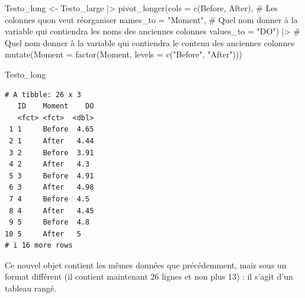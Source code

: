 \documentclass[
  french,
  a4paper,
  DIV=11,
  numbers=noendperiod,
  oneside]{scrreprt}
\newenvironment{Shaded}{}{}
\newcommand{\AttributeTok}[1]{\textcolor[rgb]{0.84,0.23,0.29}{#1}}
\newcommand{\CommentTok}[1]{\textcolor[rgb]{0.42,0.45,0.49}{#1}}
\newcommand{\FunctionTok}[1]{\textcolor[rgb]{0.44,0.26,0.76}{#1}}
\newcommand{\NormalTok}[1]{\textcolor[rgb]{0.14,0.16,0.18}{#1}}
\newcommand{\OtherTok}[1]{\textcolor[rgb]{0.44,0.26,0.76}{#1}}
\newcommand{\SpecialCharTok}[1]{\textcolor[rgb]{0.00,0.36,0.77}{#1}}
\newcommand{\StringTok}[1]{\textcolor[rgb]{0.01,0.18,0.38}{#1}}
\begin{document}
\begin{Shaded}
\begin{Highlighting}[]
\NormalTok{Testo\_long }\OtherTok{\textless{}{-}}\NormalTok{ Testo\_large }\SpecialCharTok{|\textgreater{}}
  \FunctionTok{pivot\_longer}\NormalTok{(}\AttributeTok{cols =} \FunctionTok{c}\NormalTok{(Before, After),   }\CommentTok{\# Les colonnes qu\textquotesingle{}on veut réorganiser}
               \AttributeTok{names\_to =} \StringTok{"Moment"}\NormalTok{,   }\CommentTok{\# Quel nom donner à la variable qui contiendra les noms des anciennes colonnes}
               \AttributeTok{values\_to =} \StringTok{"DO"}\NormalTok{) }\SpecialCharTok{|\textgreater{}}      \CommentTok{\# Quel nom donner à la variable qui contiendra le contenu des anciennes colonnes}
  \FunctionTok{mutate}\NormalTok{(}\AttributeTok{Moment =} \FunctionTok{factor}\NormalTok{(Moment, }\AttributeTok{levels =} \FunctionTok{c}\NormalTok{(}\StringTok{"Before"}\NormalTok{, }\StringTok{"After"}\NormalTok{)))}

\NormalTok{Testo\_long}
\end{Highlighting}
\end{Shaded}

\begin{verbatim}
# A tibble: 26 x 3
   ID    Moment    DO
   <fct> <fct>  <dbl>
 1 1     Before  4.65
 2 1     After   4.44
 3 2     Before  3.91
 4 2     After   4.3 
 5 3     Before  4.91
 6 3     After   4.98
 7 4     Before  4.5 
 8 4     After   4.45
 9 5     Before  4.8 
10 5     After   5   
# i 16 more rows
\end{verbatim}

Ce nouvel objet contient les mêmes données que précédemment, mais sous
un format différent (il contient maintenant 26 lignes et non plus 13) :
il s'agit d'un tableau rangé.
\end{document}
